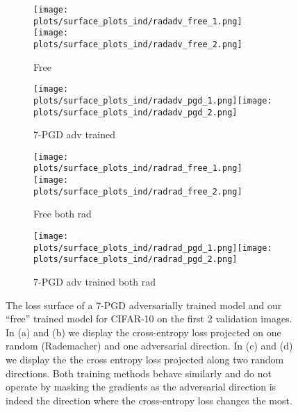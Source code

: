 \documentclass{article}
\begin{document}
\begin{figure}[t]
\centering
\begin{subfigure}{.45\textwidth}
    \centering
    \begin{minipage}[b]{1.0\linewidth}
        \texttt{[image: plots/surface\_plots\_ind/radadv\_free\_1.png]}\texttt{[image: plots/surface\_plots\_ind/radadv\_free\_2.png]}
    \end{minipage}
    \caption{Free }
    \label{fig:loss_free8_rad_adv}
\end{subfigure}
\begin{subfigure}{.45\textwidth}
    \begin{minipage}[b]{1.0\linewidth}
        \texttt{[image: plots/surface\_plots\_ind/radadv\_pgd\_1.png]}\texttt{[image: plots/surface\_plots\_ind/radadv\_pgd\_2.png]}
    \end{minipage}
    \caption{7-PGD adv trained}
    \label{fig:loss_PGD7_rad_adv}
\end{subfigure}
\begin{subfigure}{.45\textwidth}
    \centering
    \begin{minipage}[b]{1.0\linewidth}
        \texttt{[image: plots/surface\_plots\_ind/radrad\_free\_1.png]}\texttt{[image: plots/surface\_plots\_ind/radrad\_free\_2.png]}
    \end{minipage}
    \caption{Free  both rad}
    \label{fig:loss_free8_rad_rad}
\end{subfigure}
\begin{subfigure}{.45\textwidth}
    \begin{minipage}[b]{1.0\linewidth}
        \texttt{[image: plots/surface\_plots\_ind/radrad\_pgd\_1.png]}\texttt{[image: plots/surface\_plots\_ind/radrad\_pgd\_2.png]}
    \end{minipage}
    \caption{7-PGD adv trained both rad}
    \label{fig:loss_PGD7_rad_rad}
\end{subfigure}\hfill
\caption{
The loss surface of a 7-PGD adversarially trained model and our ``free'' trained model for CIFAR-10 on the first 2 validation images. In (a) and (b) we display the cross-entropy loss projected on one random (Rademacher) and one adversarial direction. In (c) and (d) we display the the cross entropy loss projected along two random directions. Both training methods behave similarly and do not operate by masking the gradients as the adversarial direction is indeed the direction where the cross-entropy loss changes the most.}
\label{fig:loss_plots}
\end{figure}
\end{document}
